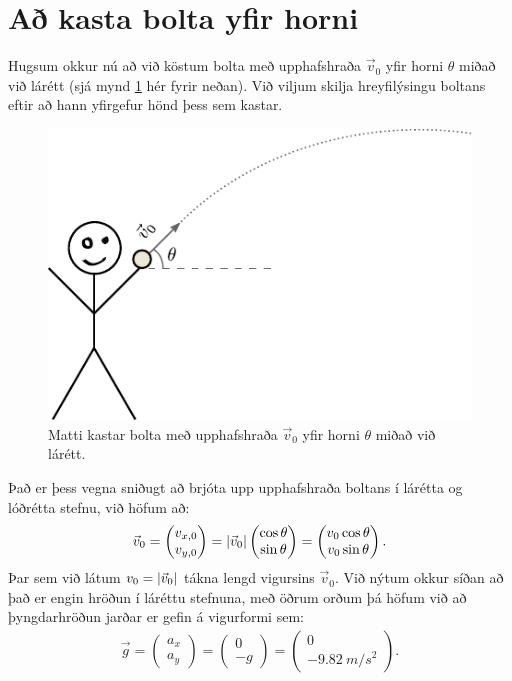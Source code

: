 \section{Að kasta bolta yfir horni}

Hugsum okkur nú að við köstum bolta með upphafshraða $\vec{v}_0$ yfir horni $\theta$ miðað við lárétt (sjá mynd \ref{fig:kasta} hér fyrir neðan). Við viljum skilja hreyfilýsingu boltans eftir að hann yfirgefur hönd þess sem kastar.

\begin{figure}[H]
    \centering
    \includegraphics{figures/kasta2.pdf}
    \caption{Matti kastar bolta með upphafshraða $\vec{v}_0$ yfir horni $\theta$ miðað við lárétt.}
    \label{fig:kasta}
\end{figure}
Það er þess vegna sniðugt að brjóta upp upphafshraða boltans í lárétta og lóðrétta stefnu, við höfum að:
\begin{align*}
    \vec{v}_0 = \begin{pmatrix} v_{x,0} \\ v_{y,0} \end{pmatrix} = \abs{\vec{v}_0} \begin{pmatrix} \cos\theta \\ \sin\theta \end{pmatrix} = \begin{pmatrix} v_0 \cos\theta \\ v_0 \sin\theta \end{pmatrix}.
\end{align*}
Þar sem við látum $v_0 = \abs{\vec{v}_0}$ tákna lengd vigursins $\vec{v}_0$. Við nýtum okkur síðan að það er engin hröðun í láréttu stefnuna, með öðrum orðum þá höfum við að þyngdarhröðun jarðar er gefin á vigurformi sem:
\begin{align*}
    \vec{g} = \begin{pmatrix} a_x \\ a_y \end{pmatrix}  =  \begin{pmatrix} 0 \\ -g \end{pmatrix} = \begin{pmatrix} 0 \\ -\SI{9.82}{m/s^2} \end{pmatrix}.
\end{align*}
